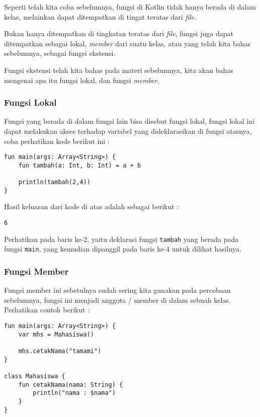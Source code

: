 Seperti telah kita coba sebelumnya, fungsi di Kotlin tidak hanya berada di dalam kelas, melainkan dapat ditempatkan di tingat teratas dari \textit{file}. 

Bukan hanya ditempatkan di tingkatan teratas dari \textit{file}, fungsi juga dapat ditempatkan sebagai lokal, \textit{member} dari suatu kelas, atau yang telah kita bahas sebelumnya, sebagai fungsi ekstensi.

Fungsi ekstensi telah kita bahas pada materi sebelumnya, kita akan bahas mengenai apa itu fungsi lokal, dan fungsi \textit{member}.

\subsubsection{Fungsi Lokal}

Fungsi yang berada di dalam fungsi lain bisa disebut fungsi lokal, fungsi lokal ini dapat melakukan akses terhadap variabel yang dideklarasikan di fungsi atasnya, coba perhatikan kode berikut ini :

\begin{lstlisting}
fun main(args: Array<String>) {
	fun tambah(a: Int, b: Int) = a + b
	
	println(tambah(2,4))
}
\end{lstlisting}

Hasil keluaran dari kode di atas adalah sebagai berikut :

\begin{lstlisting}
6
\end{lstlisting}

Perhatikan pada baris ke-2, yaitu deklarasi fungsi \texttt{tambah} yang berada pada fungsi \texttt{main}, yang kemudian dipanggil pada baris ke-4 untuk dilihat hasilnya. 

\subsubsection{Fungsi Member}

Fungsi member ini sebetulnya sudah sering kita gunakan pada percobaan sebelumnya, fungsi ini menjadi anggota / member di dalam sebuah kelas. Perhatikan contoh berikut :

\begin{lstlisting}
fun main(args: Array<String>) {
	var mhs = Mahasiswa()
	
	mhs.cetakNama("tamami")
}

class Mahasiswa {
	fun cetakNama(nama: String) {
		println("nama : $nama")
	}
}
\end{lstlisting}

